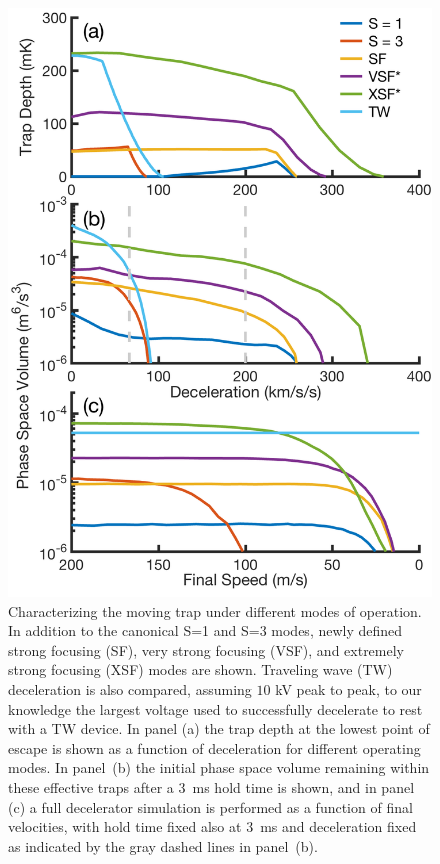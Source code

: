 \documentclass[%
 reprint,
 amsmath,amssymb,
 aps,
prl,
]{revtex4-1}
\begin{document}
\begin{figure}[t]
\includegraphics[width=\linewidth]{full-three-panel.png}%
\vspace{-5pt}
\caption{
Characterizing the moving trap under different modes of operation. In addition to the canonical S=1 and S=3 modes, newly defined strong focusing (SF), very strong focusing (VSF), and extremely strong focusing (XSF) modes are shown. Traveling wave (TW) deceleration is also compared, assuming $10$ kV peak to peak, to our knowledge the largest voltage used to successfully decelerate to rest with a TW device. In panel (a) the trap depth at the lowest point of escape is shown as a function of deceleration for different operating modes. In panel~(b) the initial phase space volume remaining within these effective traps after a $3$~ms hold time is shown, and in panel (c) a full decelerator simulation is performed as a function of final velocities, with hold time fixed also at $3$~ms and deceleration fixed as indicated by the gray dashed lines in panel~(b).}
\label{fig:efftrap}
\end{figure}
\end{document}
